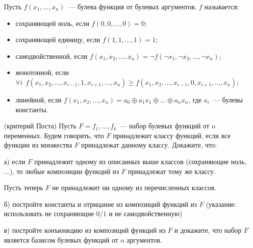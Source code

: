 Пусть $f(x_1, \dots, x_n)$~--- булева функция от булевых аргументов.
$f$ называется:
\begin{itemize}
	\item сохраняющей ноль, если $f(0, 0, \dots, 0) = 0$;
	\item сохраняющей единицу, если $f(1, 1, \dots, 1) = 1$;
	\item самодвойственной, если $f(x_1, x_2, \dots, x_n) = \neg
		f(\neg x_1, \neg x_2, \dots, \neg x_n)$;
    \item монотонной, если
		$\forall i~~ f(x_1, x_2, \dots, x_{i - 1}, 1, x_{i + 1},
        \dots,  x_n) \ge f(x_1, x_2, \dots, x_{i - 1}, 0, x_{i + 1},
        \dots,  x_n)$;
    \item линейной, если $f(x_1, x_2, \dots, x_n) = a_0 \oplus a_1x_1
		\oplus \dots \oplus a_nx_n$, где $a_i$~--- булевы константы.
\end{itemize}

\begin{task} (критерий Поста)
	Пусть $F = {f_1, \dots, f_k}$~--- набор булевых функций от $n$
    переменных. Будем говорить, что $F$ принадлежит классу функций,
    если все функции из множества $F$ принадлежат данному классу.
    Докажите, что:

	а) если $F$ принадлежит одному из описанных выше классов
    (сохраняющие ноль, ...), то любые
    композиции функций из $F$ принадлежат тому же классу.
    
    Пусть теперь $F$ не принадлежит ни одному из перечисленных
    классов.
    
    б) постройте константы и отрицание из композиций функций из $F$
    (указание: использовать не сохраняющие $0/1$ и не самодвойственную)

    в) постройте конъюнкцию из композиций функций из $F$ и докажите,
    что набор $F$ является базисом булевых функций от $n$ аргументов.

\end{task}